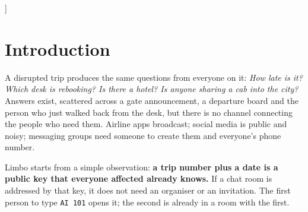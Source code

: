 \documentclass[10pt,twocolumn]{article}
\newcommand{\code}[1]{\texttt{\small #1}}
\begin{document}
{\begin{abstract}
Inside, a plain-language status line summarises crowd-confirmed facts scored by an explainable, decaying confidence
model; shared cabs and rooms let travellers split costs, with the last seat awarded to exactly one person under
contention; every message is translated into the reader's language; and verified staff can post official updates that
nobody else can forge. Because any channel member can write Nexconn message metadata, all live state is signed by the
server with Ed25519 and verified in every browser. We evaluate the system end to end against a live Nexconn app:
58 of 58 browser and API checks pass, 240 simultaneous seat claims across 30 trials produce exactly one winner every
time, and a phone that loses its connection catches up a median 0.8\,s after reconnecting.
\end{abstract}
\vspace{10pt}
}]

\section{Introduction}
A disrupted trip produces the same questions from everyone on it: \emph{How late is it? Which desk is rebooking? Is
there a hotel? Is anyone sharing a cab into the city?} Answers exist, scattered across a gate announcement, a
departure board and the person who just walked back from the desk, but there is no channel connecting the people who
need them. Airline apps broadcast; social media is public and noisy; messaging groups need someone to create them and
everyone's phone number.

Limbo starts from a simple observation: \textbf{a trip number plus a date is a public key that everyone affected already
knows.} If a chat room is addressed by that key, it does not need an organiser or an invitation. The first person to
type \code{AI 101} opens it; the second is already in a room with the first.
\end{document}
